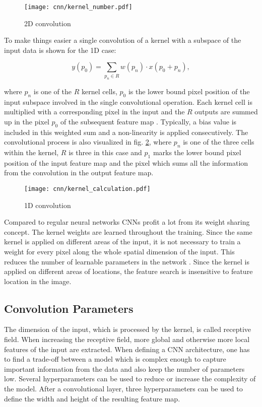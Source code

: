 \begin{figure}[H]
  \centering
  \texttt{[image: cnn/kernel\_number.pdf]}
  \caption {2D convolution}
  \label{fig:kernel_number}
\end{figure}

To make things easier a single convolution of a kernel with a subspace of the input data is shown for the 1D case:

\begin{equation}
  y(p_{0}) = \sum_{p_{n} \in R} w(p_{n}) \cdot x(p_{0} + p_{n}), 
  \label{eq:kernel}
\end{equation}

where $p_{n}$ is one of the $R$ kernel cells, $p_{0}$ is the lower bound pixel position of the input subspace involved in the single convolutional operation. Each kernel cell is multiplied with a corresponding pixel in the input and the $R$ outputs are summed up in the pixel $p_{0}$ of the subsequent feature map \cite{Dai2017}. Typically, a bias value is included in this weighted sum and a non-linearity is applied consecutively. The convolutional process is also visualized in fig. \ref{fig:kernel}, where $p_{n}$ is one of the three cells within the kernel, $R$ is three in this case and $p_{1}$ marks the lower bound pixel position of the input feature map and the pixel which sums all the information from the convolution in the output feature map.


\begin{figure}[H]
  \centering
  \texttt{[image: cnn/kernel\_calculation.pdf]}
  \caption {1D convolution}
  \label{fig:kernel}
\end{figure}

Compared to regular neural networks CNNs profit a lot from its weight sharing concept. The kernel weights are learned throughout the training. Since the same kernel is applied on different areas of the input, it is not necessary to train a weight for every pixel along the whole spatial dimension of the input. This reduces the number of learnable parameters in the network \cite{OShea2015}. Since the kernel is applied on different areas of locations, the feature search is insensitive to feature location in the image.

\subsection{Convolution Parameters}

The dimension of the input, which is processed by the kernel, is called receptive field. When increasing the receptive field, more global and otherwise more local features of the input are extracted. When defining a CNN architecture, one has to find a trade-off between a model which is complex enough to capture important information from the data and also keep the number of parameters low. Several hyperparameters can be used to reduce or increase the complexity of the model. After a convolutional layer, three hyperparameters can be used to define the width and height of the resulting feature map. 


